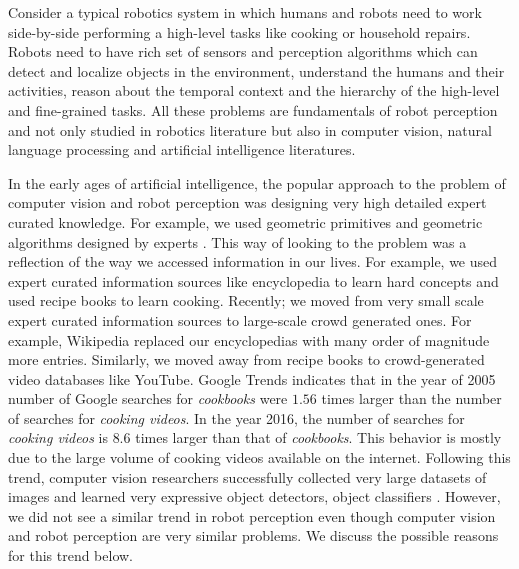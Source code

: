 

Consider a typical robotics system in which humans and robots need to work side-by-side performing a high-level tasks like cooking or household repairs. Robots need to have rich set of sensors and perception algorithms which can detect and localize objects in the environment, understand the humans and their activities, reason about the temporal context and the hierarchy of the high-level and fine-grained tasks. All these problems are fundamentals of robot perception and not only studied in robotics literature but also in computer vision, natural language processing and artificial intelligence literatures.




\todo{}

In the early ages of artificial intelligence, the popular approach to the problem of computer vision and robot perception was designing very high detailed expert curated knowledge. For example, we used geometric primitives and geometric algorithms designed by experts \cite{cylinder}. 
This way of looking to the problem was a reflection of the way we accessed information in our lives. For example, we used expert curated information sources like encyclopedia to learn hard concepts and used recipe books to learn cooking. Recently; we moved from very small scale expert curated information sources to large-scale crowd generated ones. For example, Wikipedia replaced our encyclopedias with many order of magnitude more entries. Similarly, we moved away from recipe books to crowd-generated video databases like YouTube. Google Trends\cite{google_trends} indicates that in the year of 2005 number of Google searches for \emph{cookbooks} were $1.56$ times larger than the number of searches for \emph{cooking videos}. In the year 2016, the number of searches for \emph{cooking videos} is $8.6$ times larger than that of \emph{cookbooks}. This behavior is mostly due to the large volume of cooking videos available on the internet. Following this trend, computer vision researchers successfully collected very large datasets of images and learned very expressive object detectors\cite{rcnn}, object classifiers \cite{alexnet,vggnet,googlenet,residual}. However, we did not see a similar trend in robot perception even though computer vision and robot perception are very similar problems. We discuss the possible reasons for this trend below.

